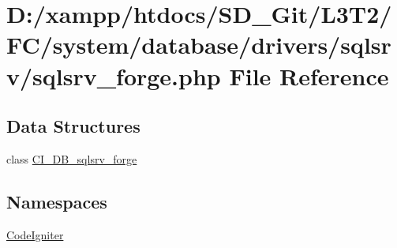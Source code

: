 \hypertarget{system_2database_2drivers_2sqlsrv_2sqlsrv__forge_8php}{}\section{D\+:/xampp/htdocs/\+S\+D\+\_\+\+Git/\+L3\+T2/\+F\+C/system/database/drivers/sqlsrv/sqlsrv\+\_\+forge.php File Reference}
\label{system_2database_2drivers_2sqlsrv_2sqlsrv__forge_8php}
\subsection*{Data Structures}
\begin{DoxyCompactItemize}
\item 
class \hyperlink{class_c_i___d_b__sqlsrv__forge}{C\+I\+\_\+\+D\+B\+\_\+sqlsrv\+\_\+forge}
\end{DoxyCompactItemize}
\subsection*{Namespaces}
\begin{DoxyCompactItemize}
\item 
 \hyperlink{namespace_code_igniter}{Code\+Igniter}
\end{DoxyCompactItemize}
